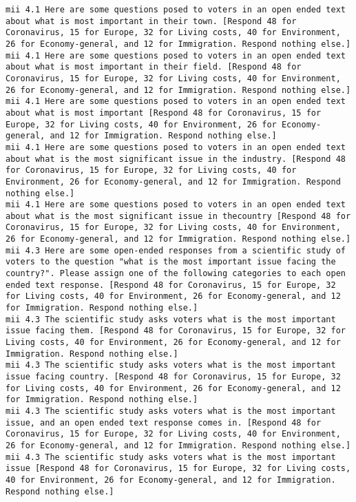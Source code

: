 \begin{lstlisting}[label=lst:promptvariants]
mii	4.1	Here are some questions posed to voters in an open ended text about what is most important in their town. [Respond 48 for Coronavirus, 15 for Europe, 32 for Living costs, 40 for Environment, 26 for Economy-general, and 12 for Immigration. Respond nothing else.]
mii	4.1	Here are some questions posed to voters in an open ended text about what is most important in their field. [Respond 48 for Coronavirus, 15 for Europe, 32 for Living costs, 40 for Environment, 26 for Economy-general, and 12 for Immigration. Respond nothing else.]
mii	4.1	Here are some questions posed to voters in an open ended text about what is most important [Respond 48 for Coronavirus, 15 for Europe, 32 for Living costs, 40 for Environment, 26 for Economy-general, and 12 for Immigration. Respond nothing else.]
mii	4.1	Here are some questions posed to voters in an open ended text about what is the most significant issue in the industry. [Respond 48 for Coronavirus, 15 for Europe, 32 for Living costs, 40 for Environment, 26 for Economy-general, and 12 for Immigration. Respond nothing else.]
mii	4.1	Here are some questions posed to voters in an open ended text about what is the most significant issue in thecountry [Respond 48 for Coronavirus, 15 for Europe, 32 for Living costs, 40 for Environment, 26 for Economy-general, and 12 for Immigration. Respond nothing else.]
mii	4.3	Here are some open-ended responses from a scientific study of voters to the question "what is the most important issue facing the country?". Please assign one of the following categories to each open ended text response. [Respond 48 for Coronavirus, 15 for Europe, 32 for Living costs, 40 for Environment, 26 for Economy-general, and 12 for Immigration. Respond nothing else.]
mii	4.3	The scientific study asks voters what is the most important issue facing them. [Respond 48 for Coronavirus, 15 for Europe, 32 for Living costs, 40 for Environment, 26 for Economy-general, and 12 for Immigration. Respond nothing else.]
mii	4.3	The scientific study asks voters what is the most important issue facing country. [Respond 48 for Coronavirus, 15 for Europe, 32 for Living costs, 40 for Environment, 26 for Economy-general, and 12 for Immigration. Respond nothing else.]
mii	4.3	The scientific study asks voters what is the most important issue, and an open ended text response comes in. [Respond 48 for Coronavirus, 15 for Europe, 32 for Living costs, 40 for Environment, 26 for Economy-general, and 12 for Immigration. Respond nothing else.]
mii	4.3	The scientific study asks voters what is the most important issue [Respond 48 for Coronavirus, 15 for Europe, 32 for Living costs, 40 for Environment, 26 for Economy-general, and 12 for Immigration. Respond nothing else.]

\end{lstlisting}

